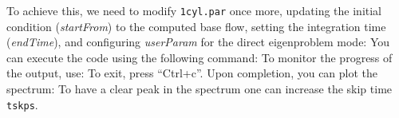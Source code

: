 \markdownRendererDocumentBegin
To achieve this, we need to modify \texttt{1cyl.par} once more, updating the initial condition (\textit{startFrom}) to the computed base flow, setting the integration time (\textit{endTime}), and configuring \textit{userParam} for the direct eigenproblem mode:\markdownRendererInterblockSeparator
{}\markdownRendererInterblockSeparator
{}\hline \bigskip You can execute the code using the following command:\markdownRendererInterblockSeparator
{}\markdownRendererInterblockSeparator
{}To monitor the progress of the output, use:\markdownRendererInterblockSeparator
{}\markdownRendererInterblockSeparator
{}To exit, press ``Ctrl+c''.\markdownRendererInterblockSeparator
{}Upon completion, you can plot the spectrum:\markdownRendererInterblockSeparator
{}\markdownRendererInterblockSeparator
{}To have a clear peak in the spectrum one can increase the skip time \texttt{tskps}.\markdownRendererDocumentEnd